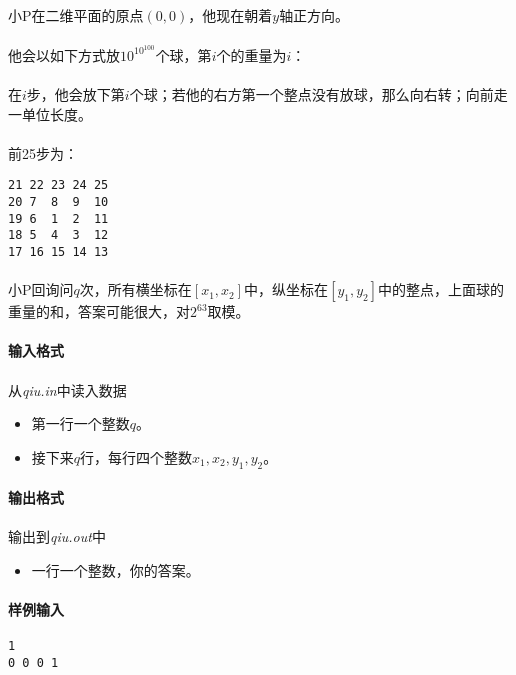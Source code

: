 \documentclass[UTF8]{ctexart}
\begin{document}
\paragraph{}小P在二维平面的原点$(0,0)$，他现在朝着$y$轴正方向。
\paragraph{}他会以如下方式放$10^{10^{100}}$个球，第$i$个的重量为$i$：
\paragraph{}在$i$步，他会放下第$i$个球；若他的右方第一个整点没有放球，那么向右转；向前走一单位长度。
\paragraph{}前25步为：
\begin{lstlisting}
21 22 23 24 25
20 7  8  9  10
19 6  1  2  11
18 5  4  3  12
17 16 15 14 13
\end{lstlisting}
\paragraph{}小P回询问$q$次，所有横坐标在$[x_1,x_2]$中，纵坐标在$[y_1,y_2]$中的整点，上面球的重量的和，答案可能很大，对$2^{63}$取模。
\paragraph{输入格式}
\paragraph{}从\emph{qiu.in}中读入数据
\begin{itemize}
	\item 第一行一个整数$q$。
	\item 接下来$q$行，每行四个整数$x_1,x_2,y_1,y_2$。
\end{itemize}
\paragraph{输出格式}
\paragraph{}输出到\emph{qiu.out}中
\begin{itemize}
	\item 一行一个整数，你的答案。
\end{itemize}
\clearpage
\paragraph{样例输入}
\begin{lstlisting}
1
0 0 0 1
\end{lstlisting}
\end{document}
